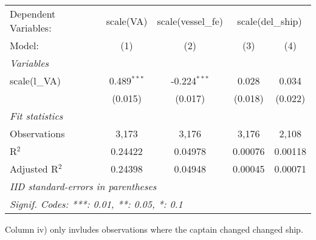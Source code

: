 
\begin{table}[htbp]
   \caption{\label{tab:value_added} }
   \centering
   \begin{tabular}{lcccc}
      \tabularnewline \midrule \midrule
      Dependent Variables: & scale(VA) & scale(vessel\_fe) & \multicolumn{2}{c}{scale(del\_ship)}\\
      Model:         & (1)           & (2)            & (3)     & (4)\\  
      \midrule
      \emph{Variables}\\
      scale(l\_VA)   & 0.489$^{***}$ & -0.224$^{***}$ & 0.028   & 0.034\\   
                     & (0.015)       & (0.017)        & (0.018) & (0.022)\\   
      \midrule
      \emph{Fit statistics}\\
      Observations   & 3,173         & 3,176          & 3,176   & 2,108\\  
      R$^2$          & 0.24422       & 0.04978        & 0.00076 & 0.00118\\  
      Adjusted R$^2$ & 0.24398       & 0.04948        & 0.00045 & 0.00071\\  
      \midrule \midrule
      \multicolumn{5}{l}{\emph{IID standard-errors in parentheses}}\\
      \multicolumn{5}{l}{\emph{Signif. Codes: ***: 0.01, **: 0.05, *: 0.1}}\\
   \end{tabular}
   
   \par \raggedright 
   Column iv) only invludes observations where the captain changed changed ship. 
\end{table}


